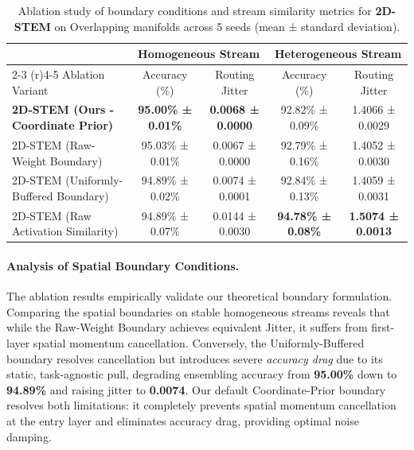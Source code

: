 \begin{table}[t]
\caption{Ablation study of boundary conditions and stream similarity metrics for \textbf{2D-STEM} on Overlapping manifolds across 5 seeds (mean ± standard deviation).}
\label{tab:ablation_boundary}
\vskip 0.15in
\begin{center}
\begin{small}
\begin{sc}
\begin{tabular}{lcccc}
\toprule
& \multicolumn{2}{c}{Homogeneous Stream} & \multicolumn{2}{c}{Heterogeneous Stream} \\
\cmidrule(r){2-3} \cmidrule(r){4-5}
Ablation Variant & Accuracy (\%) & Routing Jitter & Accuracy (\%) & Routing Jitter \\
\midrule
\textbf{2D-STEM (Ours - Coordinate Prior)} & \textbf{95.00\% ± 0.01\%} & \textbf{0.0068 ± 0.0000} & 92.82\% ± 0.09\% & 1.4066 ± 0.0029 \\
2D-STEM (Raw-Weight Boundary) & 95.03\% ± 0.01\% & 0.0067 ± 0.0000 & 92.79\% ± 0.16\% & 1.4052 ± 0.0030 \\
2D-STEM (Uniformly-Buffered Boundary) & 94.89\% ± 0.02\% & 0.0074 ± 0.0001 & 92.84\% ± 0.13\% & 1.4059 ± 0.0031 \\
\midrule
2D-STEM (Raw Activation Similarity) & 94.89\% ± 0.07\% & 0.0144 ± 0.0030 & \textbf{94.78\% ± 0.08\%} & \textbf{1.5074 ± 0.0013} \\
\bottomrule
\end{tabular}
\end{sc}
\end{small}
\end{center}
\vskip -0.1in
\end{table}

\paragraph{Analysis of Spatial Boundary Conditions.}
The ablation results empirically validate our theoretical boundary formulation. Comparing the spatial boundaries on stable homogeneous streams reveals that while the Raw-Weight Boundary achieves equivalent Jitter, it suffers from first-layer spatial momentum cancellation. Conversely, the Uniformly-Buffered boundary resolves cancellation but introduces severe \emph{accuracy drag} due to its static, task-agnostic pull, degrading ensembling accuracy from \textbf{95.00\%} down to \textbf{94.89\%} and raising jitter to \textbf{0.0074}. Our default Coordinate-Prior boundary resolves both limitations: it completely prevents spatial momentum cancellation at the entry layer and eliminates accuracy drag, providing optimal noise damping.

